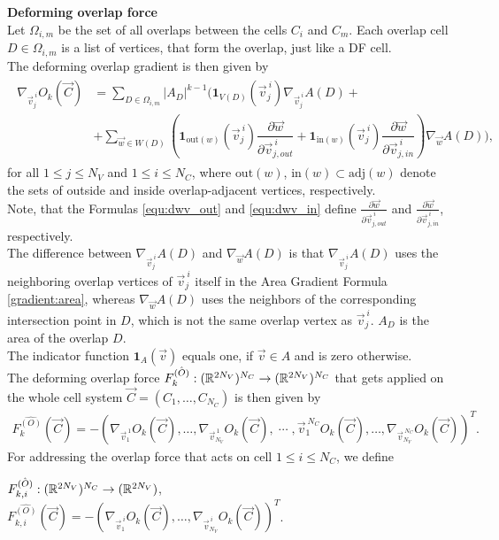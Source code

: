 \begin{proposition} \textbf{Deforming overlap force} \\
	Let $\Omega_{i,m}$ be the set of all overlaps between the cells $C_i$ and $C_m$. 
	Each overlap cell $D \in \Omega_{i,m}$ is a list of vertices, that form the overlap, just like a DF cell. \\
	The deforming overlap gradient is then given by 
	\begin{align}
		\begin{split}
			\nabla_{\vec{v}_j^{\: i}} O_k(\vec{C}) &= \sum\limits_{D \in \Omega_{i,m}}  |A_{D}|^{k-1} \Biggl(\mathbf{1}_{V(D)}(\vec{v}_j^{\: i}) \nabla_{\vec{v}_j^{\: i}}A(D)  + \\[0.5em]
				    							   &+ \sum\limits_{\vec{w} \in W(D)} \left(\mathbf{1}_{\text{out}(w)}(\vec{v}_{j}^{\: i}) \dfrac{\partial \vec{w}}{\partial \vec{v}_{j, out}^{\: i}} %
													+ \mathbf{1}_{\text{in}(w)}(\vec{v}_j^{\: i}) \dfrac{\partial \vec{w}}{\partial \vec{v}_{j, in}^{\: i}} \right) \nabla_{\vec{w}}A(D)\Biggr),
		\end{split}
	\end{align}
	for all $1 \leq j \leq N_V$ and $1 \leq i \leq N_C$, where $\text{out}(w)$, $\text{in}(w) \subset \text{adj}(w)$ denote the sets of outside and inside overlap-adjacent vertices, respectively. \\
	Note, that the Formulas \ref{equ:dwv_out} and \ref{equ:dwv_in} define $\frac{\partial \vec{w}}{\partial \vec{v}_{j, out}^{\: i}}$ and $\frac{\partial \vec{w}}{\partial \vec{v}_{j, in}^{\: i}}$, respectively. \\
	The difference between $\nabla_{\vec{v}_j^{\: i}}A(D)$ and $\nabla_{\vec{w}}A(D)$ is that $\nabla_{\vec{v}_j^{\: i}}A(D)$ uses the neighboring overlap vertices of $\vec{v}_j^{\: i}$ itself in the Area Gradient Formula \ref{gradient:area}, whereas $\nabla_{\vec{w}}A(D)$ uses the neighbors of the corresponding intersection point in $D$, which is not the same overlap vertex as $\vec{v}_j^{\: i}$.
    $A_{D}$ is the area of the overlap $D$.\\
	The indicator function $\mathbf{1}_{A}(\vec{v})$ equals one, if $\vec{v} \in A$ and is zero otherwise. \\
	The deforming overlap force $F_{k}^{\hat{(O)}}: (\mathbb{R}^{2 N_V})^{N_C} \rightarrow (\mathbb{R}^{2 N_V})^{N_C}$ that gets applied on the whole cell system $\vec{C} = (C_1, \ldots, C_{N_C})$ is then given by  
	\begin{align*}
		F_{k}^{\hat{(O)}}(\vec{C}) 
		= - (\nabla_{\vec{v}_1^{\:1}} O_k(\vec{C}), \ldots, \nabla_{\vec{v}_{N_V}^{\:1}} O_k(\vec{C}), \; \cdots \;, \vec{v}_1^{\:N_C} O_k(\vec{C}), \ldots, \nabla_{\vec{v}_{N_V}^{\:N_C}} O_k(\vec{C}))^T.
	\end{align*}
	For addressing the overlap force that acts on cell $1 \leq i \leq N_C$, we define 
	\begin{center}
		$F_{k, i}^{\hat{(O)}}: (\mathbb{R}^{2 N_V})^{N_C} \rightarrow (\mathbb{R}^{2 N_V})$, \\
		$F_{k, i}^{\hat{(O)}}(\vec{C}) = - (\nabla_{\vec{v}_1^{\:i}} O_k(\vec{C}), \ldots, \nabla_{\vec{v}_{N_V}^{\:i}} O_k(\vec{C}))^T$. 
	\end{center}


\end{proposition}
